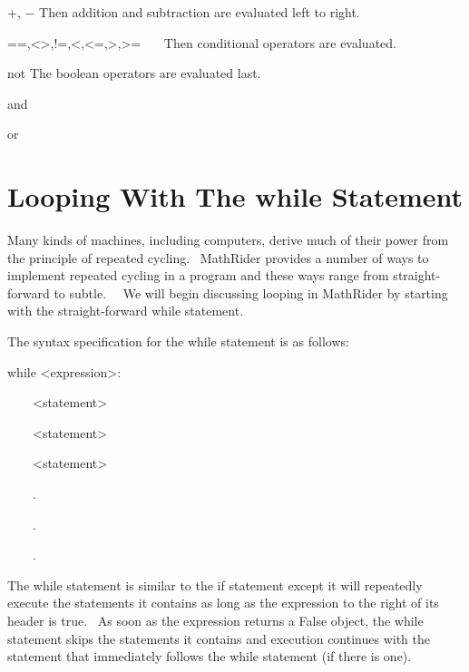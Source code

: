 \documentclass[12pt,twoside]{book}
\begin{document}
\bigskip

+, $-$ Then addition and subtraction are evaluated left to right.


\bigskip

==,{\textless}{\textgreater},!=,{\textless},{\textless}=,{\textgreater},{\textgreater}=
\ \ \ Then conditional operators are evaluated.


\bigskip

not The boolean operators are evaluated last.


\bigskip

and 


\bigskip

or 


\bigskip


\bigskip


\bigskip

\section[Looping With The while Statement]{Looping With
The while Statement}
Many kinds of machines, including computers, derive much of their power
from the principle of repeated cycling. \ MathRider provides a number
of ways to implement repeated cycling in a program and these ways range
from straight{}-forward to subtle. \ \ We will begin discussing looping
in MathRider by starting with the straight{}-forward while statement.


\bigskip

The syntax specification for the while statement is as follows:



while {\textless}expression{\textgreater}:

\ \ \ \ {\textless}statement{\textgreater}

\ \ \ \ {\textless}statement{\textgreater}

\ \ \ \ {\textless}statement{\textgreater}

\ \ \ \ .

\ \ \ \ .

\ \ \ \ .


\bigskip

The while statement is similar to the if statement except it will
repeatedly execute the statements it contains as long as the expression
to the right of its header is true. \ As soon as the expression returns
a False object, the while statement skips the statements it contains
and execution continues with the statement that immediately follows the
while statement (if there is one). 
\end{document}
